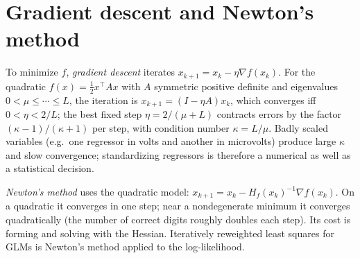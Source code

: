 \section{Gradient descent and Newton's method}
To minimize $f$, \emph{gradient descent} iterates $x_{k+1}=x_k-\eta\nabla f(x_k)$. For the quadratic $f(x)=\tfrac12x^\top Ax$ with $A$ symmetric positive definite and eigenvalues $0<\mu\le\cdots\le L$, the iteration is $x_{k+1}=(I-\eta A)x_k$, which converges iff $0<\eta<2/L$; the best fixed step $\eta=2/(\mu+L)$ contracts errors by the factor $(\kappa-1)/(\kappa+1)$ per step, with condition number $\kappa=L/\mu$. Badly scaled variables (e.g.\ one regressor in volts and another in microvolts) produce large $\kappa$ and slow convergence; standardizing regressors is therefore a numerical as well as a statistical decision.

\emph{Newton's method} uses the quadratic model: $x_{k+1}=x_k-H_f(x_k)^{-1}\nabla f(x_k)$. On a quadratic it converges in one step; near a nondegenerate minimum it converges quadratically (the number of correct digits roughly doubles each step). Its cost is forming and solving with the Hessian. Iteratively reweighted least squares for GLMs is Newton's method applied to the log-likelihood.

